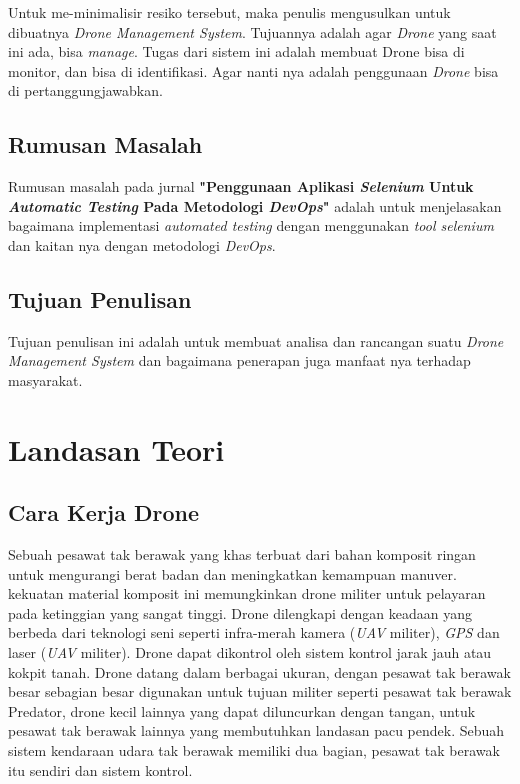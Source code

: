 \documentclass[9pt,twocolumn,twoside]{Gunadarma}
\begin{document}
Untuk me-minimalisir resiko tersebut, maka penulis mengusulkan untuk dibuatnya \textit{Drone Management System}. Tujuannya adalah agar \textit{Drone} yang saat ini ada, bisa \textit{manage}. Tugas dari sistem ini adalah membuat Drone bisa di monitor, dan bisa di identifikasi. Agar nanti nya adalah penggunaan \textit{Drone} bisa di pertanggungjawabkan. 

\subsection{Rumusan Masalah}
Rumusan masalah pada jurnal \textbf{"Penggunaan Aplikasi \textit{Selenium} Untuk \textit{Automatic Testing} Pada Metodologi \textit{DevOps}"} adalah untuk menjelasakan bagaimana implementasi \textit{automated testing} dengan menggunakan \textit{tool selenium}  dan kaitan nya dengan metodologi \textit{DevOps}. 


\subsection{Tujuan Penulisan}
Tujuan penulisan ini adalah untuk membuat analisa dan rancangan suatu \textit{Drone Management System} dan bagaimana penerapan juga manfaat nya terhadap masyarakat.  


\section{Landasan Teori}

\subsection{Cara Kerja Drone}
Sebuah pesawat tak berawak yang khas terbuat dari bahan komposit ringan untuk mengurangi berat badan dan meningkatkan kemampuan manuver. kekuatan material komposit ini memungkinkan drone militer untuk pelayaran pada ketinggian yang sangat tinggi. Drone dilengkapi dengan keadaan yang berbeda dari teknologi seni seperti infra-merah kamera (\textit{UAV} militer), \textit{GPS} dan laser (\textit{UAV} militer). Drone dapat dikontrol oleh sistem kontrol jarak jauh atau kokpit tanah. Drone datang dalam berbagai ukuran, dengan pesawat tak berawak besar sebagian besar digunakan untuk tujuan militer seperti pesawat tak berawak Predator, drone kecil lainnya yang dapat diluncurkan dengan tangan, untuk pesawat tak berawak lainnya yang membutuhkan landasan pacu pendek. Sebuah sistem kendaraan udara tak berawak memiliki dua bagian, pesawat tak berawak itu sendiri dan sistem kontrol.
\end{document}
